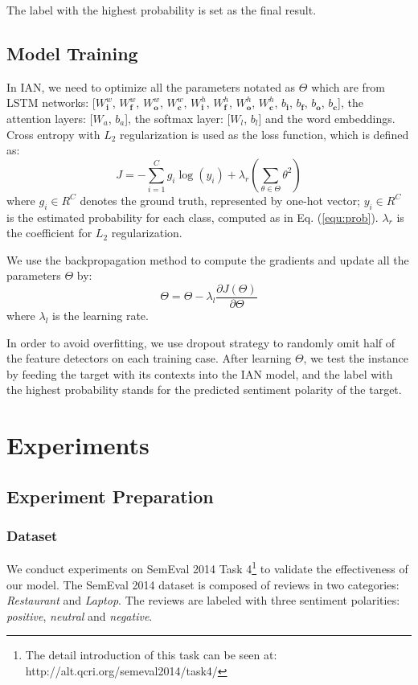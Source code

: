\documentclass{article}
\begin{document}
The label with the highest probability is set as the final result.

\subsection{Model Training}
In IAN, we need to optimize all the parameters notated as $\Theta$ which are from LSTM networks: [$W_\textbf{i}^w$, $W_\textbf{f}^w$, $W_\textbf{o}^w$, $W_\textbf{c}^w$, $W_\textbf{i}^h$, $W_\textbf{f}^h$, $W_\textbf{o}^h$, $W_\textbf{c}^h$, $b_\textbf{i}$, $b_\textbf{f}$, $b_\textbf{o}$, $b_\textbf{c}$], the attention layers: [$W_a$, $b_a$], the softmax layer: [$W_l$, $b_l$] and the word embeddings.
Cross entropy with $L_2$ regularization is used as the loss function, which is defined as:
\begin{equation}
J = -\sum_{i=1}^{C}g_{i}\log(y_i) + \lambda_r(\sum_{\theta \in \Theta }\theta^2)
\end{equation}
where $g_i \in R^{C}$ denotes the ground truth, represented by one-hot vector; $y_i \in R^{C}$ is the estimated probability for each class, computed as in Eq. (\ref{equ:prob}). $\lambda_r$ is the coefficient for $L_2$ regularization.

We use the backpropagation method to compute the gradients and update all the parameters $\Theta$ by:
\begin{equation}
\Theta = \Theta - \lambda_l  \frac{\partial J(\Theta)}{\partial\Theta}
\end{equation}
where $\lambda_l$ is the learning rate.

In order to avoid overfitting, we use dropout strategy to randomly omit half of the feature detectors on each training case. 
After learning  $\Theta$, we test the instance by feeding the target with its contexts into the IAN model, and the label with the highest probability stands for the predicted sentiment polarity of the target. 

\section{Experiments} 
\subsection{Experiment Preparation}
\subsubsection*{Dataset} 
We conduct experiments on SemEval 2014 Task 4\footnote{The detail introduction of this task can be seen at: http://alt.qcri.org/semeval2014/task4/} to validate the effectiveness of our model. 
The  SemEval 2014  dataset is composed of reviews in two categories: \emph{Restaurant} and \emph{Laptop}.
The reviews are labeled with three sentiment polarities: \emph{positive}, \emph{neutral} and \emph{negative}. 
\end{document}
